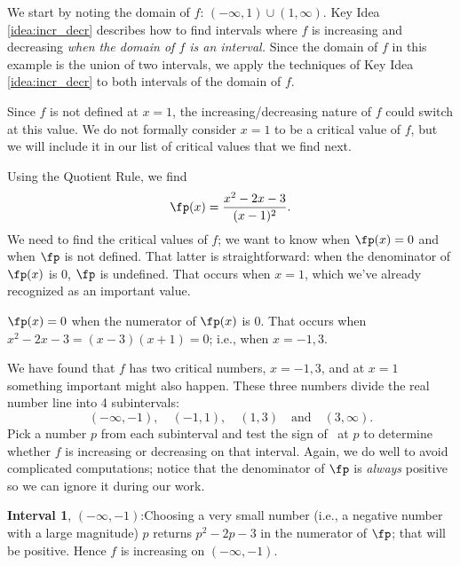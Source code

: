 {We start by noting the domain of $f$: $(-\infty,1)\cup(1,\infty)$. Key Idea \ref{idea:incr_decr} describes how to find intervals where $f$ is increasing and decreasing \textit{when the domain of $f$ is an interval.} Since the domain of $f$ in this example is the union of two intervals, we apply the techniques of Key Idea \ref{idea:incr_decr} to both intervals of the domain of $f$. 

Since $f$ is not defined at $x=1$, the increasing/decreasing nature of $f$ could switch at this value. We do not formally consider $x=1$ to be a critical value of $f$, but we will include it in our list of critical values that we find next.

Using the Quotient Rule, we find
\[
\fp(x) = \frac{x^2-2x-3}{(x-1)^2}.
\]
We need to find the critical values of $f$; we want to know when $\fp(x)=0$ and when $\fp$ is not defined. That latter is straightforward: when the denominator of $\fp(x)$ is 0, $\fp$ is undefined. That occurs when $x=1$, which we've already recognized as an important value.


$\fp(x)=0$ when the numerator of $\fp(x)$ is 0. That occurs when $x^2-2x-3 = (x-3)(x+1) = 0$; i.e., when $x=-1,3$. 

We have found that $f$ has two critical numbers, $x=-1,3$, and at $x=1$ something important might also happen. These three numbers divide the real number line into 4 subintervals: 
\[
(-\infty,-1), \quad (-1, 1), \quad (1,3) \quad \text{and} \quad (3,\infty).
\]
 Pick a number $p$ from each subinterval and test the sign of \fp\ at $p$ to determine whether $f$ is increasing or decreasing on that interval. Again, we do well to avoid complicated computations; notice that the denominator of $\fp$ is \textit{always} positive so we can ignore it during our work.

\noindent\textbf{Interval 1}, $(-\infty,-1)$:\quad  Choosing a very small number (i.e., a negative number with a large magnitude) $p$ returns $p^2-2p-3$ in the numerator of $\fp$; that will be positive. Hence $f$ is increasing on $(-\infty,-1)$.

}
